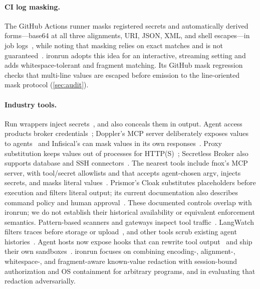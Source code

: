 \documentclass[10pt,twocolumn]{article}
\newcommand{\sys}{\textsf{ironrun}}
\newcommand{\code}[1]{\textup{\texttt{\detokenize{#1}}}}
\begin{document}
\paragraph{CI log masking.} The GitHub Actions runner masks registered secrets
and automatically derived forms---base64 at all three alignments, URI, JSON, XML,
and shell escapes---in job logs~\citep{githubrunner2019encoders}, while noting
that masking relies on exact matches and is not guaranteed~\citep{github2026secureuse}.
\sys{} adopts this idea for an interactive, streaming setting and adds
whitespace-tolerant and fragment matching. Its GitHub mask regression checks
that multi-line values are escaped before emission to the line-oriented mask
protocol (\cref{sec:audit}).

\paragraph{Industry tools.} Run wrappers inject
secrets~\citep{onepassword_oprun,doppler_cli,infisical_run}, and \code{op run}
also conceals them in output. Agent access products broker
credentials~\citep{onepassword2026unified,bitwarden2026agentaccess}; Doppler's
MCP server deliberately exposes values to agents~\citep{doppler_mcp} and
Infisical's can mask values in its own responses~\citep{infisical_mcp}.
Proxy substitution keeps values out of processes for
HTTP(S)~\citep{claudecode_sandboxing,infisical_agentproxy,onecli2026,flyio_tokenizer};
Secretless Broker also supports database and SSH connectors~\citep{cyberark_secretless}.
The nearest tools include fnox's MCP server, with tool/secret allowlists and
\code{exec} that accepts agent-chosen argv, injects secrets, and masks literal
values~\citep{fnox_mcp}. Prismor's Cloak substitutes placeholders before
execution and filters literal output; its current documentation also describes
command policy and human approval~\citep{prismor2026,prismor_decisions,prismor_approvals}.
These documented controls overlap with \sys{}; we do not establish their
historical availability or equivalent enforcement semantics.
Pattern-based scanners and gateways inspect
tool traffic~\citep{ggshield_aihook,truefoundry_secrets,mcpguard2026,redactmcp2026}.
LangWatch filters traces before storage or upload~\citep{langwatch_redaction},
and other tools scrub existing agent histories~\citep{agentsweep2026}. Agent hosts now expose hooks
that can rewrite tool output~\citep{claudecode_hooks} and ship their own
sandboxes~\citep{claudecode_sandboxing,anthropic_srt}. \sys{} focuses on
combining encoding-, alignment-, whitespace-, and fragment-aware known-value
redaction with session-bound authorization and OS containment for arbitrary
programs, and in evaluating that redaction adversarially.
\end{document}
